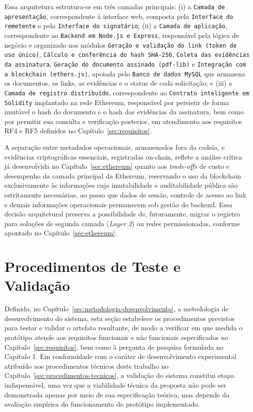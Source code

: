 \documentclass[
    12pt,
    a4paper,
    oneside,
    chapter=TITLE,
    section=TITLE,
    subsection=TITLE,
    subsubsection=TITLE,
    sumario=tradicional,
    english,
    brazil
]{abntex2}
\newcommand{\elem}[1]{\texttt{#1}}
\begin{document}
Essa arquitetura estrutura-se em três camadas principais: (i) a \elem{Camada de apresentação}, correspondente à interface web, composta pela \elem{Interface do remetente} e pela \elem{Interface do signatário}; (ii) a \elem{Camada de aplicação}, correspondente ao \elem{Backend em Node.js e Express}, responsável pela lógica de negócio e organizado nos módulos \elem{Geração e validação do link (token de uso único)}, \elem{Cálculo e conferência do hash SHA-256}, \elem{Coleta das evidências da assinatura}, \elem{Geração do documento assinado (pdf-lib)} e \elem{Integração com a blockchain (ethers.js)}, apoiada pelo \elem{Banco de dados MySQL} que armazena os documentos, os links, as evidências e o status de cada solicitação; e (iii) a \elem{Camada de registro distribuído}, correspondente ao \elem{Contrato inteligente em Solidity} implantado na rede Ethereum, responsável por persistir de forma imutável o hash do documento e o hash das evidências da assinatura, bem como por permitir sua consulta e verificação posterior, em atendimento aos requisitos RF4 e RF5 definidos no Capítulo~\ref{sec:requisitos}.

A separação entre metadados operacionais, armazenados fora da cadeia, e evidências criptográficas essenciais, registradas on-chain, reflete a análise crítica já desenvolvida no Capítulo~\ref{sec:ethereum} quanto aos \emph{trade-offs} de custo e desempenho da camada principal da Ethereum, reservando o uso da blockchain exclusivamente às informações cuja imutabilidade e auditabilidade pública são estritamente necessárias, ao passo que dados de sessão, controle de acesso ao link e demais informações operacionais permanecem sob gestão do backend. Essa decisão arquitetural preserva a possibilidade de, futuramente, migrar o registro para soluções de segunda camada (\emph{Layer 2}) ou redes permissionadas, conforme apontado no Capítulo~\ref{sec:ethereum}.

\FloatBarrier
\section{Procedimentos de Teste e Validação}
\label{sec:testes}

Definida, no Capítulo~\ref{sec:metodologia-desenvolvimento}, a metodologia de desenvolvimento do sistema, esta seção estabelece os procedimentos previstos para testar e validar o artefato resultante, de modo a verificar em que medida o protótipo atende aos requisitos funcionais e não funcionais especificados no Capítulo~\ref{sec:requisitos}, bem como à pergunta de pesquisa formulada no Capítulo 1. Em conformidade com o caráter de desenvolvimento experimental atribuído aos procedimentos técnicos deste trabalho no Capítulo~\ref{sec:procedimentos-tecnicos}, a validação do sistema constitui etapa indispensável, uma vez que a viabilidade técnica da proposta não pode ser demonstrada apenas por meio de sua especificação teórica, mas depende da avaliação empírica do funcionamento do protótipo implementado.
\end{document}
